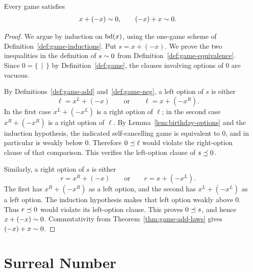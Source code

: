 \begin{theorem}
  \label{thm:game-add-inverse}
  \leanok
  Every game satisfies
  \[
    x+(-x)\sim0,
    \qquad
    (-x)+x\sim0.
  \]
\end{theorem}
\begin{proof}
  \leanok
  We argue by induction on \(\operatorname{bd}(x)\), using the one-game scheme of
  Definition~\ref{def:game-inductions}.  Put \(s=x+(-x)\).  We prove the two
  inequalities in the definition of \(s\sim0\) from
  Definition~\ref{def:game-equivalence}.  Since \(0=\{\,\mid\,\}\) by
  Definition~\ref{def:game}, the clauses involving options of \(0\) are
  vacuous.

  By Definitions~\ref{def:game-add} and~\ref{def:game-neg}, a left option of
  \(s\) is either
  \[
    \ell=x^L+(-x)
    \qquad\text{or}\qquad
    \ell=x+(-x^R).
  \]
  In the first case \(x^L+(-x^L)\) is a right option of \(\ell\); in the
  second case \(x^R+(-x^R)\) is a right option of \(\ell\).  By
  Lemma~\ref{lem:birthday-options} and the induction hypothesis, the indicated
  self-cancelling game is equivalent to \(0\), and in particular is weakly
  below \(0\).  Therefore \(0\preceq\ell\) would violate the right-option
  clause of that comparison.  This verifies the left-option clause of
  \(s\preceq0\).

  Similarly, a right option of \(s\) is either
  \[
    r=x^R+(-x)
    \qquad\text{or}\qquad
    r=x+(-x^L).
  \]
  The first has \(x^R+(-x^R)\) as a left option, and the second has
  \(x^L+(-x^L)\) as a left option.  The induction hypothesis makes that left
  option weakly above \(0\).  Thus \(r\preceq0\) would violate its
  left-option clause.  This proves \(0\preceq s\), and hence
  \(x+(-x)\sim0\).  Commutativity from
  Theorem~\ref{thm:game-add-laws} gives \((-x)+x\sim0\).
\end{proof}

\section{Surreal Number}

